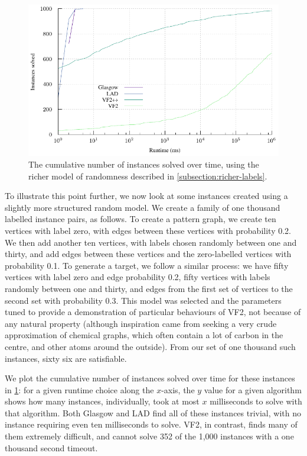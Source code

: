 \documentclass[twoside,11pt]{article}
\begin{document}
\begin{figure}[t]
    \centering
    \includegraphics*{plots/skewed.pdf}

    \caption{The cumulative number of instances solved over time, using the richer model of
    randomness described in \cref{subsection:richer-labels}.}
    \label{figure:skewed-cumulative}
\end{figure}

To illustrate this point further, we now look at some instances created using a slightly more
structured random model. We create a family of one thousand labelled instance pairs, as follows. To
create a pattern graph, we create ten vertices with label zero, with edges between these vertices
with probability 0.2. We then add another ten vertices, with labels chosen randomly between one and
thirty, and add edges between these vertices and the zero-labelled vertices with probability 0.1.
To generate a target, we follow a similar process: we have fifty vertices with label zero and edge
probability 0.2, fifty vertices with labels randomly between one and thirty, and edges from the
first set of vertices to the second set with probability 0.3.  This model was selected and the
parameters tuned to provide a demonstration of particular behaviours of VF2, not because of any natural
property (although inspiration came from seeking a very crude approximation of chemical graphs,
which often contain a lot of carbon in the centre, and other atoms around the outside). From our set
of one thousand such instances, sixty six are satisfiable.

We plot the cumulative number of instances solved over time for these instances in
\cref{figure:skewed-cumulative}: for a given runtime choice along the $x$-axis, the $y$ value for a
given algorithm shows how many instances, individually, took at most $x$ milliseconds to solve with
that algorithm. Both Glasgow and LAD find all of these instances trivial, with no instance requiring
even ten milliseconds to solve. VF2, in contrast, finds many of them extremely difficult, and cannot
solve 352 of the 1,000 instances with a one thousand second timeout.
\end{document}
